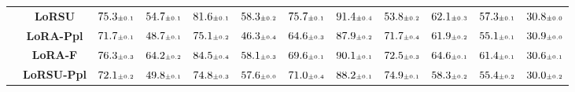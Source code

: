 \begin{table}
\begin{center}
\begin{small}
\begin{tabular}{l c c c c c c c c c c c}
& \textbf{LoRSU} & $75.3 \mtiny{\pm 0.1}$ & $54.7 \mtiny{\pm 0.1}$ & $81.6 \mtiny{\pm 0.1}$ & $58.3 \mtiny{\pm 0.2}$ & $75.7 \mtiny{\pm 0.1}$ & $91.4 \mtiny{\pm 0.4}$ & $53.8 \mtiny{\pm 0.2}$ & $62.1 \mtiny{\pm 0.3}$ & $57.3 \mtiny{\pm 0.1}$ & $30.8 \mtiny{\pm 0.0}$ \\
& \textbf{LoRA-Ppl} & $71.7 \mtiny{\pm 0.1}$ & $48.7 \mtiny{\pm 0.1}$ & $75.1 \mtiny{\pm 0.2}$ & $46.3 \mtiny{\pm 0.4}$ & $64.6 \mtiny{\pm 0.3}$ & $87.9 \mtiny{\pm 0.2}$ & $71.7 \mtiny{\pm 0.4}$ & $61.9 \mtiny{\pm 0.2}$ & $55.1 \mtiny{\pm 0.1}$ & $30.9 \mtiny{\pm 0.0}$ \\
& \textbf{LoRA-F} & $76.3 \mtiny{\pm 0.3}$ & $64.2 \mtiny{\pm 0.2}$ & $84.5 \mtiny{\pm 0.4}$ & $58.1 \mtiny{\pm 0.3}$ & $69.6 \mtiny{\pm 0.1}$ & $90.1 \mtiny{\pm 0.1}$ & $72.5 \mtiny{\pm 0.3}$ & $64.6 \mtiny{\pm 0.1}$ & $61.4 \mtiny{\pm 0.1}$ & $30.6 \mtiny{\pm 0.1}$ \\
& \textbf{LoRSU-Ppl} & $72.1 \mtiny{\pm 0.2}$ & $49.8 \mtiny{\pm 0.1}$ & $74.8 \mtiny{\pm 0.3}$ & $57.6 \mtiny{\pm 0.0}$ & $71.0 \mtiny{\pm 0.4}$ & $88.2 \mtiny{\pm 0.1}$ & $74.9 \mtiny{\pm 0.1}$ & $58.3 \mtiny{\pm 0.2}$ & $55.4 \mtiny{\pm 0.2}$ & $30.0 \mtiny{\pm 0.2}$ \\
\bottomrule
\end{tabular}
\endgroup
\end{small}
\end{center}
\vskip -0.1in
\end{table}


